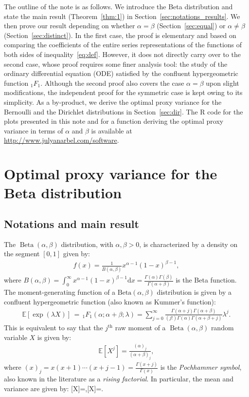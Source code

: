 \documentclass[15pt]{article}
\newcommand{\E}{\mathbb{E}}
\newcommand{\ddr}{\mathrm{d}}
\def\E{\mathbb{E}}
\DeclareMathOperator{\Var}{Var}
\DeclareMathOperator{\Beta}{Beta}
\def\Rcode{The \textsf{R} code for the plots presented in this note and for a function deriving the optimal proxy variance in terms of $\alpha$ and $\beta$ is available at \href{http://www.julyanarbel.com/software}{\textsf{http://www.julyanarbel.com/software}}.}
\theoremstyle{plain}
\begin{document}

The outline of the note is as follows. We introduce the Beta distribution and state the main result (Theorem~\ref{thm:1}) in Section~\ref{sec:notations_results}. We then prove our result 
 depending on whether $\alpha=\beta$ (Section~\ref{sec:equal}) or $\alpha\neq\beta$ (Section~\ref{sec:distinct}). In the first case, the proof is elementary and based on comparing the coefficients of the entire series representations of the functions of both sides of inequality~\eqref{eq:def}. However, it does not directly carry over to the second case, whose proof requires some finer analysis tool: the study of the ordinary differential equation (ODE) satisfied by the confluent hypergeometric function $_1F_1$. 
Although the second proof also covers the case $\alpha=\beta$ upon slight modifications, the independent proof for the symmetric case is kept owing to its simplicity. As a by-product, we derive the optimal proxy variance for the Bernoulli and the Dirichlet distributions in Section~\ref{sec:dir}. 
\Rcode


\section{Optimal proxy variance for the Beta distribution}
\subsection{Notations and main result\label{sec:notations_results}}

The $\Beta(\alpha,\beta)$ distribution, with $\alpha,\beta>0$, is characterized by a density on the segment $[0,1]$ given by:
%
\begin{align*}%
f(x) = \frac{1}{B(\alpha,\beta)} x^{\alpha-1}(1-x)^{\beta-1},
\end{align*}
where $B(\alpha,\beta) = \int_0^\infty x^{\alpha-1}(1-x)^{\beta-1} \ddr x = \frac{\Gamma(\alpha)\Gamma(\beta)}{\Gamma(\alpha+\beta)}$ is the Beta function. The moment-generating function of a $\text{Beta}(\alpha,\beta)$ distribution is given by a confluent hypergeometric function (also known as Kummer's function):
%
\begin{align}\label{eq:HyperGeo}
\E[\exp(\lambda X)]\,= \,_1F_1(\alpha;\alpha+\beta;\lambda)=\sum_{j=0}^\infty\frac{\Gamma(\alpha+j)\Gamma(\alpha+\beta)}{(j!) \Gamma(\alpha)\Gamma(\alpha+\beta+j)}\lambda^j.
\end{align}
%
This is equivalent to say that the $j^{\text{th}}$ raw moment of a $\Beta(\alpha,\beta)$ random variable $X$ is given by:
\begin{align}\label{eq:RawMoments}
 \E[X^j] = \frac{(\alpha)_j}{(\alpha+\beta)_j},
\end{align}
%
where $(x)_j=x(x+1)\cdots(x+j-1)=\frac{\Gamma(x+j)}{\Gamma(x)}$ is the \textit{Pochhammer symbol}, also known in the literature as a \textit{rising factorial}. In particular, the mean and variance are given by:
\beqq \E[X]=\frac\alpha{\alpha+\beta},\quad\Var[X]=.\eeqq
\end{document}
